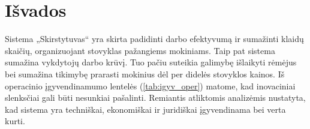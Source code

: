 \chapter{Išvados}

Sistema „Skirstytuvas“ yra skirta padidinti darbo efektyvumą ir sumažinti 
klaidų skaičių, organizuojant stovyklas pažangiems mokiniams. Taip pat 
sistema sumažina vykdytojų darbo krūvį. Tuo pačiu suteikia galimybę 
išlaikyti rėmėjus bei sumažina tikimybę prarasti mokinius dėl per
didelės stovyklos kainos. Iš operacinio įgyvendinamumo lentelės 
(\ref{tab:igyv_oper})
matome, kad inovaciniai slenksčiai gali būti nesunkiai pašalinti.
Remiantis atliktomis analizėmis nustatyta, kad sistema yra techniškai, 
ekonomiškai ir juridiškai įgyvendinama bei verta kurti.
